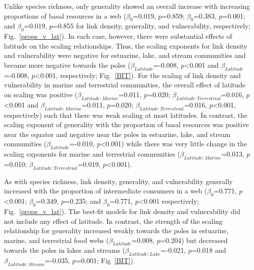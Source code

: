 \documentclass[12pt]{article}
\begin{document}
  Unlike species richness, only generality showed an overall increase with
  increasing proportions of basal resources in a web ($\beta_0$=0.019,
  $p$=0.859; $\beta_0$=0.383, $p$=0.001; and $\beta_0$=0.019, $p$=0.855 for
  link density, generality, and vulnerability, respectively;
  Fig.~\ref{props_v_lat}). In each case, however, there were substantial
  effects of latitude on the scaling relationships. Thus, the scaling
  exponents for link density and vulnerability were negative for estuarine,
  lake, and stream communities and became more negative towards the poles
  ($\beta_{Latitude}$=-0.008, $p$\textless0.001 and $\beta_{Latitude}$=-0.008,
  $p$\textless0.001, respectively; Fig.~\ref{BIT}). For the scaling of link
  density and vulnerability in marine and terrestrial communities, the overall
  effect of latitude on scaling was positive ($\beta_{Latitude:Marine}$=0.011,
  $p$=0.020; $\beta_{Latitude:Terrestrial}$=0.016, $p$\textless0.001 and
  $\beta_{Latitude:Marine}$=0.011, $p$=0.020;
  $\beta_{Latitude:Terrestrial}$=0.016, $p$\textless0.001, respectively) such
  that there was weak scaling at most latitudes. In contrast, the scaling
  exponent of generality with the proportion of basal resources was positive
  near the equator and negative near the poles in estuarine, lake, and stream
  communities ($\beta_{Latitude}$=-0.010, $p$\textless0.001) while there was
  very little change in the scaling exponents for marine and terrestrial
  communities ($\beta_{Latitude:Marine}$=0.013, $p$=0.010;
  $\beta_{Latitude:Terrestrial}$=0.019, $p$\textless0.001).


  As with species richness, link density, generality, and vulnerability
  generally increased with the proportion of intermediate consumers in a web
  ($\beta_0$=0.771, $p$\textless0.001; $\beta_0$=0.349, $p$=0.235; and
  $\beta_0$=0.771, $p$\textless0.001 respectively; Fig.~\ref{props_v_lat}). 
  The best-fit models for link density and vulnerability did not include
  any effect of latitude. In contrast, the strength of the scaling relationship
  for generality increased weakly towards the poles in estuarine, marine, and
  terrestrial food webs ($\beta_{Latitude}$=0.008, $p$=0.204) but decreased 
  towards the poles in lakes and streams ($\beta_{Latitude:Lake}$=-0.021, $p$=0.018
  and $\beta_{Latitude:Stream}$=-0.035, $p$=0.001; Fig~\ref{BIT}).
\end{document}

